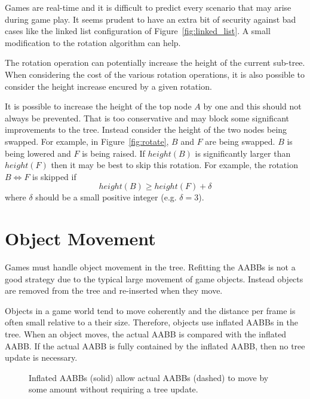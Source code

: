 \documentclass{article}
\begin{document}
Games are real-time and it is difficult to predict every scenario that may arise during game play. It seems prudent to have an extra bit of security against bad cases like the linked list configuration of Figure~\ref{fig:linked_list}. A small modification to the rotation algorithm can help.

The rotation operation can potentially increase the height of the current sub-tree. When considering the cost of the various rotation operations, it is also possible to consider the height increase encured by a given rotation.

It is possible to increase the height of the top node $A$ by one and this should not always be prevented. That is too conservative and may block some significant improvements to the tree. Instead consider the height of the two nodes being swapped. For example, in Figure~\ref{fig:rotate}, $B$ and $F$ are being swapped. $B$ is being lowered and $F$ is being raised. If $height(B)$ is significantly larger than $height(F)$ then it may be best to skip this rotation. For example, the rotation $B \Leftrightarrow F$ is skipped if
\[ height(B) \geq height(F) + \delta \]
where $\delta$ should be a small positive integer (e.g. $\delta = 3$).

\section{Object Movement}

Games must handle object movement in the tree. Refitting the AABBs is not a good strategy due to the typical large movement of game objects. Instead objects are removed from the tree and re-inserted when they move. 

Objects in a game world tend to move coherently and the distance per frame is often small relative to a their size. Therefore, objects use inflated AABBs in the tree. When an object moves, the actual AABB is compared with the inflated AABB. If the actual AABB is fully contained by the inflated AABB, then no tree update is necessary.

\begin{figure}
	\begin{center}
		
	\end{center}
	\caption{Inflated AABBs (solid) allow actual AABBs (dashed) to move by some amount without requiring a tree update. }
	\label{fig:inflated}
\end{figure}
\end{document}
